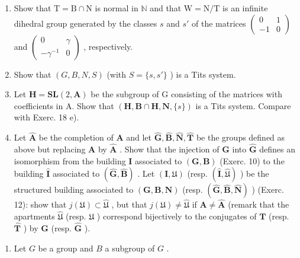 \begin{enumerate}
\def\labelenumi{\alph{enumi})}
\item
  Show that \(\mathrm{T} = \mathrm{B} \cap \mathrm{N}\) is normal in \(\mathbb{N}\) and that \(\mathrm{W} = \mathrm{N} / \mathrm{T}\) is an infinite dihedral group generated by the classes \(s\) and \(s'\) of the matrices \(\left( \begin{array}{cc}0 & 1\\ -1 & 0 \end{array} \right)\) and \(\left( \begin{array}{cc}0 & \gamma \\ -\gamma^{-1} & 0 \end{array} \right)\) , respectively.
\item
  Show that \((G, B, N, S)\) (with \(S = \{s, s'\}\) ) is a Tits system.
\item
  Let \(\mathbf{H} = \mathbf{SL}(2, \mathbf{A})\) be the subgroup of G consisting of the matrices with coefficients in A. Show that \((\mathbf{H}, \mathbf{B} \cap \mathbf{H}, \mathbf{N}, \{s\})\) is a Tits system. Compare with Exerc. 18 e).
\item
  Let \(\hat{\mathbf{A}}\) be the completion of \(\mathbf{A}\) and let \(\hat{\mathbf{G}},\hat{\mathbf{B}},\hat{\mathbf{N}},\hat{\mathbf{T}}\) be the groups defined as above but replacing \(\mathbf{A}\) by \(\hat{\mathbf{A}}\) . Show that the injection of \(\mathbf{G}\) into \(\hat{\mathbf{G}}\) defines an isomorphism from the building \(\mathbf{I}\) associated to \((\mathbf{G},\mathbf{B})\) (Exerc. 10) to the building \(\hat{\mathbf{I}}\) associated to \((\hat{\mathbf{G}},\hat{\mathbf{B}})\) . Let \((\mathbf{I},\mathfrak{U})\) (resp. \((\hat{\mathbf{I}},\hat{\mathfrak{U}})\) ) be the structured building associated to \((\mathbf{G},\mathbf{B},\mathbf{N})\) (resp. \((\hat{\mathbf{G}},\hat{\mathbf{B}},\hat{\mathbf{N}})\) ) (Exerc. 12): show that \(j(\mathfrak{U})\subset \hat{\mathfrak{U}}\) , but that \(j(\mathfrak{U})\neq \hat{\mathfrak{U}}\) if \(\mathbf{A}\neq \hat{\mathbf{A}}\) (remark that the apartments \(\hat{\mathfrak{U}}\) (resp. \(\mathfrak{U}\) ) correspond bijectively to the conjugates of \(\mathbf{T}\) (resp. \(\hat{\mathbf{T}}\) ) by \(\mathbf{G}\) (resp. \(\hat{\mathbf{G}}\) ).
\end{enumerate}

\begin{enumerate}
\def\labelenumi{\arabic{enumi})}
\setcounter{enumi}{21}
\tightlist
\item
  Let \(G\) be a group and \(B\) a subgroup of \(G\) .
\end{enumerate}

